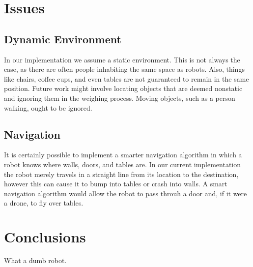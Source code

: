 \documentclass[a4paper,11pt]{article}
\begin{document}
\section{Issues}
\subsection{Dynamic Environment}
In our implementation we assume a static environment. This is not always the case, as there are often people inhabiting the same space as robots. Also, things like chairs, coffee cups, and even tables are not guaranteed to remain in the same position. Future work might involve locating objects that are deemed nonstatic and ignoring them in the weighing process. Moving objects, such as a person walking, ought to be ignored.

\subsection{Navigation}
It is certainly possible to implement a smarter navigation algorithm in which a robot knows where walls, doors, and tables are. In our current implementation the robot merely travels in a straight line from its location to the destination, however this can cause it to bump into tables or crash into walls. A smart navigation algorithm would allow the robot to pass throuh a door and, if it were a drone, to fly over tables.

\section{Conclusions}
What a dumb robot.








  
\end{document}
